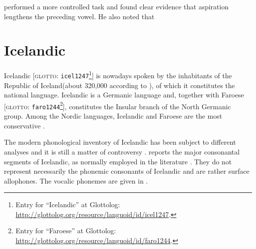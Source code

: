\documentclass[11pt,a4paper,openany]{memoir}\usepackage[]{graphicx}\usepackage[]{color}
\begin{document}


\citet{durvasula2012} performed a more controlled task and found clear evidence that aspiration lengthens the preceding vowel.
He also noted that %

\section{Icelandic}

Icelandic [\textsc{glotto}: \texttt{icel1247}\footnote{Entry for ``Icelandic'' at Glottolog: \url{http://glottolog.org/resource/languoid/id/icel1247}.}] is nowadays spoken by the inhabitants of the Republic of Iceland(about 320,000 according to \citealt{arnason2011}), of which it constitutes the national language.
Icelandic is a Germanic language and, together with Faroese [\textsc{glotto}: \texttt{faro1244}\footnote{Entry for ``Faroese'' at Glottolog: \url{http://glottolog.org/resource/languoid/id/faro1244}.}], constitutes the Insular branch of the North Germanic group.
Among the Nordic languages, Icelandic and Faroese are the most conservative \citep{harbert2006,konig2013}.

The modern phonological inventory of Icelandic has been subject to different analyses and it is still a matter of controversy \citep{thraisson1978,jessen1998,arnason2011}.
 reports the major consonantal segments of Icelandic, as normally employed in the literature \citep[98]{arnason2011}.
They do not represent necessarily the phonemic consonants of Icelandic and are rather surface allophones.
The vocalic phonemes are given in  \citep[60]{arnason2011}.

\end{document}
